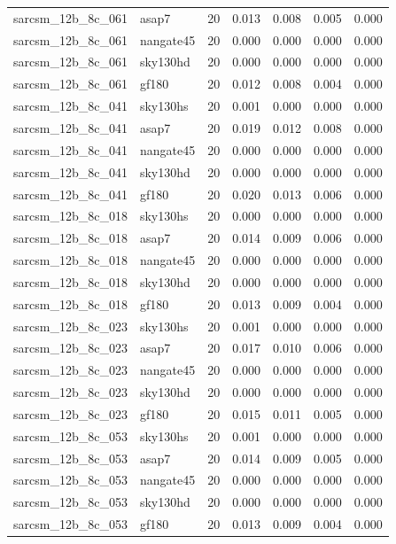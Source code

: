 \begin{tabular}{llrrrrr}
sarcsm\_12b\_8c\_061 & asap7 & 20 & 0.013 & 0.008 & 0.005 & 0.000 \\
sarcsm\_12b\_8c\_061 & nangate45 & 20 & 0.000 & 0.000 & 0.000 & 0.000 \\
sarcsm\_12b\_8c\_061 & sky130hd & 20 & 0.000 & 0.000 & 0.000 & 0.000 \\
sarcsm\_12b\_8c\_061 & gf180 & 20 & 0.012 & 0.008 & 0.004 & 0.000 \\
sarcsm\_12b\_8c\_041 & sky130hs & 20 & 0.001 & 0.000 & 0.000 & 0.000 \\
sarcsm\_12b\_8c\_041 & asap7 & 20 & 0.019 & 0.012 & 0.008 & 0.000 \\
sarcsm\_12b\_8c\_041 & nangate45 & 20 & 0.000 & 0.000 & 0.000 & 0.000 \\
sarcsm\_12b\_8c\_041 & sky130hd & 20 & 0.000 & 0.000 & 0.000 & 0.000 \\
sarcsm\_12b\_8c\_041 & gf180 & 20 & 0.020 & 0.013 & 0.006 & 0.000 \\
sarcsm\_12b\_8c\_018 & sky130hs & 20 & 0.000 & 0.000 & 0.000 & 0.000 \\
sarcsm\_12b\_8c\_018 & asap7 & 20 & 0.014 & 0.009 & 0.006 & 0.000 \\
sarcsm\_12b\_8c\_018 & nangate45 & 20 & 0.000 & 0.000 & 0.000 & 0.000 \\
sarcsm\_12b\_8c\_018 & sky130hd & 20 & 0.000 & 0.000 & 0.000 & 0.000 \\
sarcsm\_12b\_8c\_018 & gf180 & 20 & 0.013 & 0.009 & 0.004 & 0.000 \\
sarcsm\_12b\_8c\_023 & sky130hs & 20 & 0.001 & 0.000 & 0.000 & 0.000 \\
sarcsm\_12b\_8c\_023 & asap7 & 20 & 0.017 & 0.010 & 0.006 & 0.000 \\
sarcsm\_12b\_8c\_023 & nangate45 & 20 & 0.000 & 0.000 & 0.000 & 0.000 \\
sarcsm\_12b\_8c\_023 & sky130hd & 20 & 0.000 & 0.000 & 0.000 & 0.000 \\
sarcsm\_12b\_8c\_023 & gf180 & 20 & 0.015 & 0.011 & 0.005 & 0.000 \\
sarcsm\_12b\_8c\_053 & sky130hs & 20 & 0.001 & 0.000 & 0.000 & 0.000 \\
sarcsm\_12b\_8c\_053 & asap7 & 20 & 0.014 & 0.009 & 0.005 & 0.000 \\
sarcsm\_12b\_8c\_053 & nangate45 & 20 & 0.000 & 0.000 & 0.000 & 0.000 \\
sarcsm\_12b\_8c\_053 & sky130hd & 20 & 0.000 & 0.000 & 0.000 & 0.000 \\
sarcsm\_12b\_8c\_053 & gf180 & 20 & 0.013 & 0.009 & 0.004 & 0.000 \\

\end{tabular}
